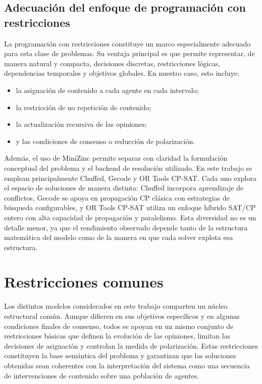 \documentclass[10pt,letterpaper]{article}
\begin{document}
\subsection{Adecuaci\'on del enfoque de programaci\'on con restricciones}

La programaci\'on con restricciones constituye un marco especialmente adecuado para esta clase de problemas. Su ventaja principal es que permite representar, de manera natural y compacta, decisiones discretas, restricciones l\'ogicas, dependencias temporales y objetivos globales. En nuestro caso, esto incluye:

\begin{itemize}
    \item la asignaci\'on de contenido a cada agente en cada intervalo;
    \item la restricci\'on de no repetici\'on de contenido;
    \item la actualizaci\'on recursiva de las opiniones;
    \item y las condiciones de consenso o reducci\'on de polarizaci\'on.
\end{itemize}

Adem\'as, el uso de MiniZinc permite separar con claridad la formulaci\'on conceptual del problema y el backend de resoluci\'on utilizado. En este trabajo se emplean principalmente Chuffed, Gecode y OR Tools CP-SAT. Cada uno explora el espacio de soluciones de manera distinta: Chuffed incorpora aprendizaje de conflictos, Gecode se apoya en propagaci\'on CP cl\'asica con estrategias de b\'usqueda configurables, y OR Tools CP-SAT utiliza un enfoque h\'ibrido SAT/CP entero con alta capacidad de propagaci\'on y paralelismo. Esta diversidad no es un detalle menor, ya que el rendimiento observado depende tanto de la estructura matem\'atica del modelo como de la manera en que cada solver explota esa estructura.



\section{Restricciones comunes}

Los distintos modelos considerados en este trabajo comparten un n\'ucleo estructural com\'un. Aunque difieren en sus objetivos espec\'ificos y en algunas condiciones finales de consenso, todos se apoyan en un mismo conjunto de restricciones b\'asicas que definen la evoluci\'on de las opiniones, limitan las decisiones de asignaci\'on y controlan la medida de polarizaci\'on. Estas restricciones constituyen la base sem\'antica del problema y garantizan que las soluciones obtenidas sean coherentes con la interpretaci\'on del sistema como una secuencia de intervenciones de contenido sobre una poblaci\'on de agentes.
\end{document}
